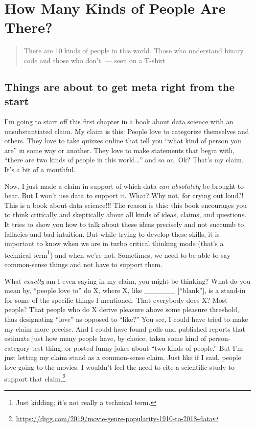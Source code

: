 \documentclass[openany]{book}
\begin{document}
\hypertarget{how-many-kinds-of-people-are-there}{%
\chapter*{How Many Kinds of People Are There?}\label{how-many-kinds-of-people-are-there}}

\begin{quote}
There are 10 kinds of people in this world.
Those who understand binary code and those who don't.
--- seen on a T-shirt
\end{quote}

\hypertarget{things-are-about-to-get-meta-right-from-the-start}{%
\section*{Things are about to get meta right from the start}\label{things-are-about-to-get-meta-right-from-the-start}}

I'm going to start off this first chapter in a book about data science with an unsubstantiated claim. My claim is this: People love to categorize themselves and others. They love to take quizzes online that tell you ``what kind of person you are'' in some way or another. They love to make statements that begin with, ``there are two kinds of people in this world\ldots{}'' and so on. Ok? That's my claim. It's a bit of a mouthful.

Now, I just made a claim in support of which data \emph{can absolutely} be brought to bear. But I won't use data to support it. What? Why not, for crying out loud?! This is a book about data science!!! The reason is this: this book encourages you to think critically and skeptically about all kinds of ideas, claims, and questions. It tries to show you how to talk about these ideas precisely and not succumb to fallacies and bad intuition. But while trying to develop these skills, it is important to know when we are in turbo critical thinking mode (that's a technical term\footnote{Just kidding; it's not really a technical term.}) and when we're not. Sometimes, we need to be able to say common-sense things and not have to support them.

What \emph{exactly} am I even saying in my claim, you might be thinking? What do you mean by, ``people love to'' do X, where X, like \_\_\_\_\_\_ {[}``blank''{]}, is a stand-in for some of the specific things I mentioned. That everybody does X? Most people? That people who do X derive pleasure above some pleasure threshold, thus designating ``love'' as opposed to ``like?'' You see, I could have tried to make my claim more precise. And I could have found polls and published reports that estimate just how many people have, by choice, taken some kind of person-category-test-thing, or posted funny jokes about ``two kinds of people.'' But I'm just letting my claim stand as a common-sense claim. Just like if I said, people love going to the movies. I wouldn't feel the need to cite a scientific study to support that claim.\footnote{\url{https://digg.com/2019/movie-genre-popularity-1910-to-2018-data}}
\end{document}
